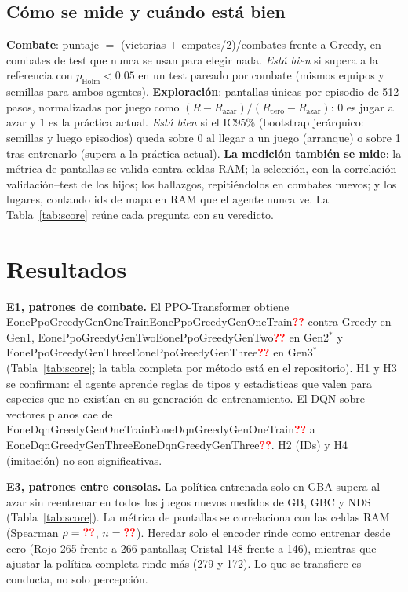 \documentclass[conference]{IEEEtran}
\newcommand{\val}[1]{\ifcsname #1\endcsname\csname #1\endcsname\else\textbf{\textcolor{red}{??}}\fi}
\newcommand{\inputgen}[1]{\IfFileExists{generated/#1}{}{\textbf{\textcolor{red}{[\detokenize{#1} pendiente]}}}}
\begin{document}
\subsection*{Cómo se mide y cuándo está bien}
\textbf{Combate}: puntaje $=$ (victorias $+$ empates/2)/combates frente a Greedy, en combates de test que nunca se usan para elegir nada. \emph{Está bien} si supera a la referencia con $p_{\mathrm{Holm}}<0.05$ en un test pareado por combate (mismos equipos y semillas para ambos agentes).
\textbf{Exploración}: pantallas únicas por episodio de 512 pasos, normalizadas por juego como $(R-R_{\text{azar}})/(R_{\text{cero}}-R_{\text{azar}})$: 0 es jugar al azar y 1 es la práctica actual. \emph{Está bien} si el IC95\% (bootstrap jerárquico: semillas y luego episodios) queda sobre 0 al llegar a un juego (arranque) o sobre 1 tras entrenarlo (supera a la práctica actual).
\textbf{La medición también se mide}: la métrica de pantallas se valida contra celdas RAM; la selección, con la correlación validación--test de los hijos; los hallazgos, repitiéndolos en combates nuevos; y los lugares, contando ids de mapa en RAM que el agente nunca ve. La Tabla~\ref{tab:score} reúne cada pregunta con su veredicto.

\begin{table}[t]
\caption{Tablero de veredictos (generado por \texttt{scripts/ares\_u\_scorecard.py}). Criterios fijados antes de ver los resultados de test. $\checkmark$: se cumple; $\times$: no se cumple; parcial: en $k$ de $n$ juegos. $p_H$: $p$ con Holm.}
\label{tab:score}
\centering\scriptsize\setlength{\tabcolsep}{3pt}\renewcommand{\arraystretch}{1.05}
\inputgen{tab_score.tex}
\end{table}

\section{Resultados}
\textbf{E1, patrones de combate.} El PPO-Transformer obtiene \val{EonePpoGreedyGenOneTrain} contra Greedy en Gen1, \val{EonePpoGreedyGenTwo} en Gen2$^\ast$ y \val{EonePpoGreedyGenThree} en Gen3$^\ast$ (Tabla~\ref{tab:score}; la tabla completa por método está en el repositorio). H1 y H3 se confirman: el agente aprende reglas de tipos y estadísticas que valen para especies que no existían en su generación de entrenamiento. El DQN sobre vectores planos cae de \val{EoneDqnGreedyGenOneTrain} a \val{EoneDqnGreedyGenThree}. H2 (IDs) y H4 (imitación) no son significativas.

\textbf{E3, patrones entre consolas.} La política entrenada solo en GBA supera al azar sin reentrenar en todos los juegos nuevos medidos de GB, GBC y NDS (Tabla~\ref{tab:score}). La métrica de pantallas se correlaciona con las celdas RAM (Spearman $\rho=\val{EthreeRho}$, $n=\val{EthreeRhoN}$). Heredar solo el encoder rinde como entrenar desde cero (Rojo 265 frente a 266 pantallas; Cristal 148 frente a 146), mientras que ajustar la política completa rinde más (279 y 172). Lo que se transfiere es conducta, no solo percepción.
\end{document}

